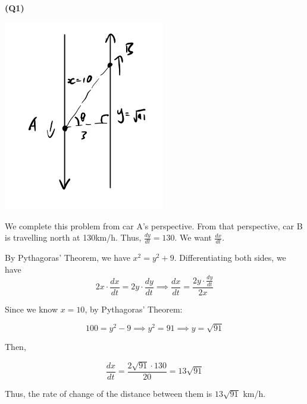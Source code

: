 \documentclass[12pt, a4paper]{article}
\newcommand{\Ddx}[2]{\frac{d#1}{d#2}}
\begin{document}
\textbf{(Q1)}

\includegraphics[width=7cm]{related_rates.jpg}

We complete this problem from car A's perspective. From that perspective, car B
is travelling north at 130km/h. Thus, $\Ddx{y}{t} = 130$. We want $\Ddx{x}{t}$.

By Pythagoras' Theorem, we have $x^2 = y^2 + 9$. Differentiating both sides,
we have
\[
    2x \cdot \Ddx{x}{t} = 2y \cdot \Ddx{y}{t}
    \implies \Ddx{x}{t} = \frac{2y \cdot \Ddx{y}{t}}{2x}
\]

Since we know $x = 10$, by Pythagoras' Theorem:

\[
    100 = y^2 - 9 \implies y^2 = 91 \implies y = \sqrt{91}
\]

Then,

\[
    \Ddx{x}{t} = \frac{2\sqrt{91} \cdot 130}{20} = 13\sqrt{91}
\]

Thus, the rate of change of the distance between them is $13\sqrt{91}$ km/h.
\end{document}
